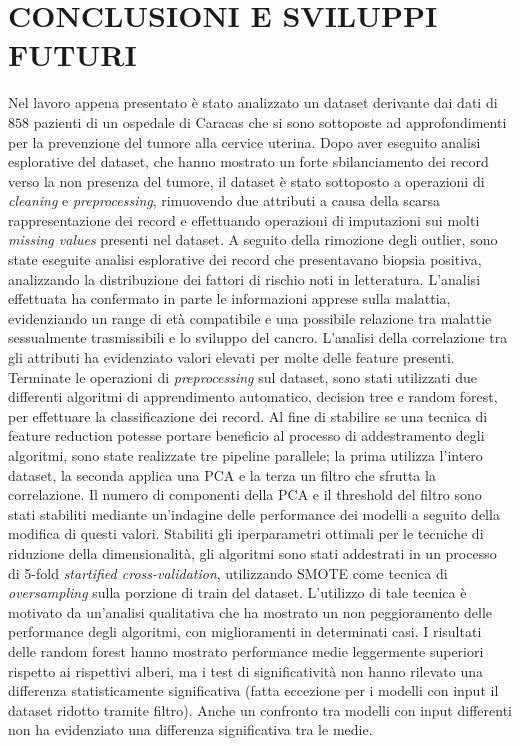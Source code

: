 \section{CONCLUSIONI E SVILUPPI FUTURI}
Nel lavoro appena presentato è stato analizzato un dataset derivante dai dati di $858$ pazienti di un ospedale di Caracas che si sono sottoposte ad approfondimenti per la prevenzione del tumore alla cervice uterina.
Dopo aver eseguito analisi esplorative del dataset, che hanno mostrato un forte sbilanciamento dei record verso la non presenza del tumore, il dataset è stato sottoposto a operazioni di \textit{cleaning} e \textit{preprocessing}, rimuovendo due attributi a causa della scarsa rappresentazione dei record e effettuando operazioni di imputazioni sui molti \textit{missing values} presenti nel dataset.
A seguito della rimozione degli outlier, sono state eseguite analisi esplorative dei record che presentavano biopsia positiva, analizzando la distribuzione dei fattori di rischio noti in letteratura.
L'analisi effettuata ha confermato in parte le informazioni apprese sulla malattia, evidenziando un range di età compatibile e una possibile relazione tra malattie sessualmente trasmissibili e lo sviluppo del cancro.
L'analisi della correlazione tra gli attributi ha evidenziato valori elevati per molte delle feature presenti.\\
Terminate le operazioni di \textit{preprocessing} sul dataset, sono stati utilizzati due differenti algoritmi di apprendimento automatico, decision tree e random forest, per effettuare la classificazione dei record.
Al fine di stabilire se una tecnica di feature reduction potesse portare beneficio al processo di addestramento degli algoritmi, sono state realizzate tre pipeline parallele; la prima utilizza l'intero dataset, la seconda applica una PCA e la terza un filtro che sfrutta la correlazione.
Il numero di componenti della PCA e il threshold del filtro sono stati stabiliti mediante un'indagine delle performance dei modelli a seguito della modifica di questi valori.
Stabiliti gli iperparametri ottimali per le tecniche di riduzione della dimensionalità, gli algoritmi sono stati addestrati in un processo di 5-fold \textit{startified cross-validation}, utilizzando SMOTE come tecnica di \textit{oversampling} sulla porzione di train del dataset.
L'utilizzo di tale tecnica è motivato da un'analisi qualitativa che ha mostrato un non peggioramento delle performance degli algoritmi, con miglioramenti in determinati casi.
I risultati delle random forest hanno mostrato performance medie leggermente superiori rispetto ai rispettivi alberi, ma i test di significatività non hanno rilevato una differenza statisticamente significativa (fatta eccezione per i modelli con input il dataset ridotto tramite filtro). Anche un confronto tra modelli con input differenti non ha evidenziato una differenza significativa tra le medie.
